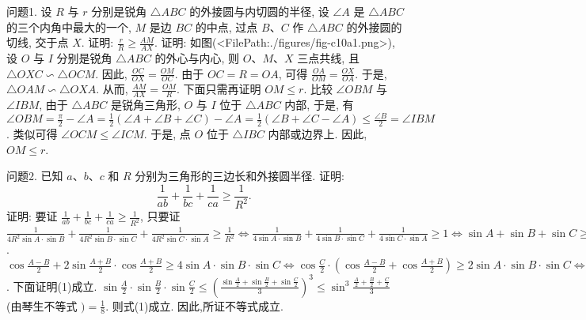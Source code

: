 
问题1. 设 $R$ 与 $r$ 分别是锐角 $\triangle A B C$ 的外接圆与内切圆的半径, 设 $\angle A$ 是 $\triangle A B C$
的三个内角中最大的一个, $M$ 是边 $B C$ 的中点, 过点 $B 、 C$ 作 $\triangle A B C$ 的外接圆的切线, 交于点 $X$. 证明: $\frac{r}{R} \geqslant \frac{A M}{A X}$.
证明: 如图(<FilePath:./figures/fig-c10a1.png>), 设 $O$ 与 $I$ 分别是锐角 $\triangle A B C$ 的外心与内心, 则 $O 、 M 、 X$ 三点共线, 且 $\triangle O X C \backsim \triangle O C M$. 因此, $\frac{O C}{O X}= \frac{O M}{O C}$. 由于 $O C=R=O A$, 可得 $\frac{O A}{O M}=\frac{O X}{O A}$. 于是, $\triangle O A M \backsim \triangle O X A$. 从而, $\frac{A M}{A X}=\frac{O M}{R}$.
下面只需再证明 $O M \leqslant r$. 比较 $\angle O B M$ 与 $\angle I B M$, 由于 $\triangle A B C$ 是锐角三角形, $O$ 与 $I$ 位于 $\triangle A B C$ 内部, 于是, 有 $\angle O B M=\frac{\pi}{2}-\angle A=\frac{1}{2}(\angle A+\angle B+\angle C)-\angle A=\frac{1}{2}(\angle B+\angle C-\angle A) \leqslant \frac{\angle B}{2}=\angle I B M$. 类似可得 $\angle O C M \leqslant \angle I C M$. 于是, 点 $O$ 位于 $\triangle I B C$ 内部或边界上.
因此, $O M \leqslant r$.



问题2. 已知 $a 、 b 、 c$ 和 $R$ 分别为三角形的三边长和外接圆半径.
证明:
$$
\frac{1}{a b}+\frac{1}{b c}+\frac{1}{c a} \geqslant \frac{1}{R^2} \text {. }
$$
证明: 要证 $\frac{1}{a b}+\frac{1}{b c}+\frac{1}{c a} \geqslant \frac{1}{R^2}$, 只要证 $\frac{1}{4 R^2 \sin A \cdot \sin B}+ \frac{1}{4 R^2 \sin B \cdot \sin C}+\frac{1}{4 R^2 \sin C \cdot \sin A} \geqslant \frac{1}{R^2} \Leftrightarrow \frac{1}{4 \sin A \cdot \sin B}+\frac{1}{4 \sin B \cdot \sin C}+ \frac{1}{4 \sin C \cdot \sin A} \geqslant 1 \Leftrightarrow \sin A+\sin B+\sin C \geqslant 4 \sin A \cdot \sin B \cdot \sin C \Leftrightarrow 2 \sin \frac{A+B}{2}$. $\cos \frac{A-B}{2}+2 \sin \frac{A+B}{2} \cdot \cos \frac{A+B}{2} \geqslant 4 \sin A \cdot \sin B \cdot \sin C \Leftrightarrow \cos \frac{C}{2} \cdot \left(\cos \frac{A-B}{2}+\cos \frac{A+B}{2}\right) \geqslant 2 \sin A \cdot \sin B \cdot \sin C \Leftrightarrow 2 \cos \frac{A}{2} \cdot \cos \frac{B}{2} \cdot \cos \frac{C}{2} \geqslant 2 \sin A \cdot \sin B \cdot \sin C \Leftrightarrow \sin \frac{A}{2} \cdot \sin \frac{B}{2} \cdot \sin \frac{C}{2} \leqslant \frac{1}{8} \cdots(1)$.
下面证明(1)成立.
$\sin \frac{A}{2} \cdot \sin \frac{B}{2} \cdot \sin \frac{C}{2} \leqslant\left(\frac{\sin \frac{A}{2}+\sin \frac{B}{2}+\sin \frac{C}{2}}{3}\right)^3 \leqslant \sin ^3 \frac{\frac{A}{2}+\frac{B}{2}+\frac{C}{2}}{3}$ (由琴生不等式 $)=\frac{1}{8}$. 则式(1)成立.
因此,所证不等式成立.



